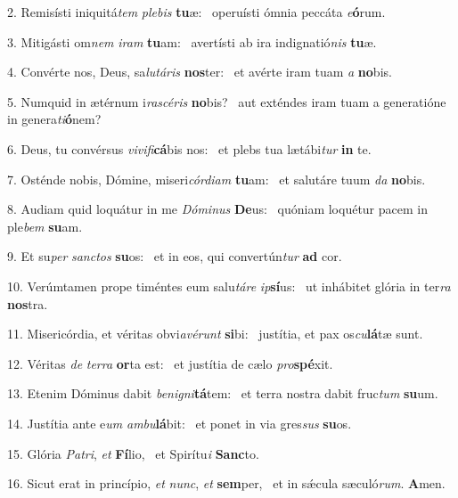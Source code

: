 2. Remisísti iniquitá\textit{tem} \textit{ple}\textit{bis} \textbf{tu}æ: \ast\  operuísti ómnia peccáta \textit{e}\textbf{ó}rum.\

3. Mitigásti om\textit{nem} \textit{i}\textit{ram} \textbf{tu}am: \ast\  avertísti ab ira indignatió\textit{nis} \textbf{tu}æ.\

4. Convérte nos, Deus, sa\textit{lu}\textit{tá}\textit{ris} \textbf{nos}ter: \ast\  et avérte iram tuam \textit{a} \textbf{no}bis.\

5. Numquid in ætérnum i\textit{ra}\textit{scé}\textit{ris} \textbf{no}bis? \ast\  aut exténdes iram tuam a generatióne in genera\textit{ti}\textbf{ó}nem?\

6. Deus, tu convérsus \textit{vi}\textit{vi}\textit{fi}\textbf{cá}bis nos: \ast\  et plebs tua lætábi\textit{tur} \textbf{in} te.\

7. Osténde nobis, Dómine, miseri\textit{cór}\textit{di}\textit{am} \textbf{tu}am: \ast\  et salutáre tuum \textit{da} \textbf{no}bis.\

8. Audiam quid loquátur in me \textit{Dó}\textit{mi}\textit{nus} \textbf{De}us: \ast\  quóniam loquétur pacem in ple\textit{bem} \textbf{su}am.\

9. Et su\textit{per} \textit{sanc}\textit{tos} \textbf{su}os: \ast\  et in eos, qui convertún\textit{tur} \textbf{ad} cor.\

10. Verúmtamen prope timéntes eum salu\textit{tá}\textit{re} \textit{ip}\textbf{sí}us: \ast\  ut inhábitet glória in ter\textit{ra} \textbf{nos}tra.\

11. Misericórdia, et véritas obvi\textit{a}\textit{vé}\textit{runt} \textbf{si}bi: \ast\  justítia, et pax os\textit{cu}\textbf{lá}tæ sunt.\

12. Véritas \textit{de} \textit{ter}\textit{ra} \textbf{or}ta est: \ast\  et justítia de cælo \textit{pro}\textbf{spé}xit.\

13. Etenim Dóminus dabit \textit{be}\textit{ni}\textit{gni}\textbf{tá}tem: \ast\  et terra nostra dabit fruc\textit{tum} \textbf{su}um.\

14. Justítia ante e\textit{um} \textit{am}\textit{bu}\textbf{lá}bit: \ast\  et ponet in via gres\textit{sus} \textbf{su}os.\

15. Glória \textit{Pa}\textit{tri}, \textit{et} \textbf{Fí}lio, \ast\  et Spirítu\textit{i} \textbf{Sanc}to.\

16. Sicut erat in princípio, \textit{et} \textit{nunc}, \textit{et} \textbf{sem}per, \ast\  et in sǽcula sæculó\textit{rum}. \textbf{A}men.\

